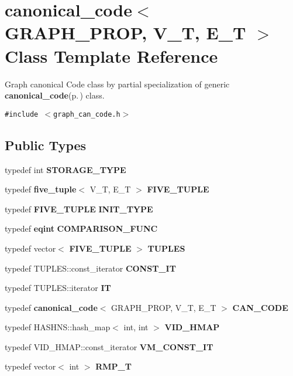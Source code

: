 \section{canonical\_\-code$<$ GRAPH\_\-PROP, V\_\-T, E\_\-T $>$ Class Template Reference}
\label{classcanonical__code_3_01GRAPH__PROP_00_01V__T_00_01E__T_01_4}
Graph canonical Code class by partial specialization of generic {\bf canonical\_\-code}{\rm (p.\,\pageref{classcanonical__code})} class.  


{\tt \#include $<$graph\_\-can\_\-code.h$>$}

\subsection*{Public Types}
\begin{CompactItemize}
\item 
typedef int {\bf STORAGE\_\-TYPE}\label{classcanonical__code_3_01GRAPH__PROP_00_01V__T_00_01E__T_01_4_w0}

\item 
typedef {\bf five\_\-tuple}$<$ V\_\-T, E\_\-T $>$ {\bf FIVE\_\-TUPLE}\label{classcanonical__code_3_01GRAPH__PROP_00_01V__T_00_01E__T_01_4_w1}

\item 
typedef {\bf FIVE\_\-TUPLE} {\bf INIT\_\-TYPE}\label{classcanonical__code_3_01GRAPH__PROP_00_01V__T_00_01E__T_01_4_w2}

\item 
typedef {\bf eqint} {\bf COMPARISON\_\-FUNC}\label{classcanonical__code_3_01GRAPH__PROP_00_01V__T_00_01E__T_01_4_w3}

\item 
typedef vector$<$ {\bf FIVE\_\-TUPLE} $>$ {\bf TUPLES}\label{classcanonical__code_3_01GRAPH__PROP_00_01V__T_00_01E__T_01_4_w4}

\item 
typedef TUPLES::const\_\-iterator {\bf CONST\_\-IT}\label{classcanonical__code_3_01GRAPH__PROP_00_01V__T_00_01E__T_01_4_w5}

\item 
typedef TUPLES::iterator {\bf IT}\label{classcanonical__code_3_01GRAPH__PROP_00_01V__T_00_01E__T_01_4_w6}

\item 
typedef {\bf canonical\_\-code}$<$ GRAPH\_\-PROP, V\_\-T, E\_\-T $>$ {\bf CAN\_\-CODE}\label{classcanonical__code_3_01GRAPH__PROP_00_01V__T_00_01E__T_01_4_w7}

\item 
typedef HASHNS::hash\_\-map$<$ int, int $>$ {\bf VID\_\-HMAP}\label{classcanonical__code_3_01GRAPH__PROP_00_01V__T_00_01E__T_01_4_w8}

\item 
typedef VID\_\-HMAP::const\_\-iterator {\bf VM\_\-CONST\_\-IT}\label{classcanonical__code_3_01GRAPH__PROP_00_01V__T_00_01E__T_01_4_w9}

\item 
typedef vector$<$ int $>$ {\bf RMP\_\-T}\label{classcanonical__code_3_01GRAPH__PROP_00_01V__T_00_01E__T_01_4_w10}

\end{CompactItemize}
